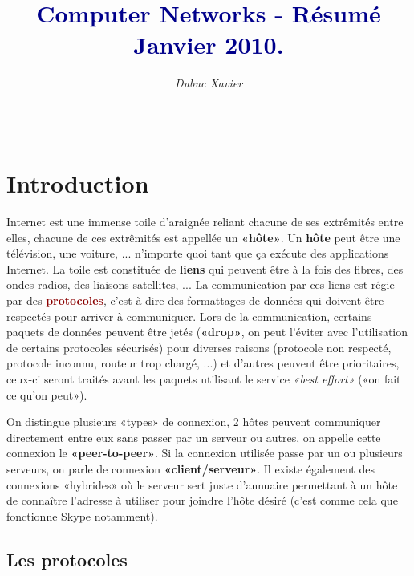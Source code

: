 \documentclass{article}
\title{\textbf{\textcolor{darkblue}{Computer Networks - Résumé Janvier 2010.}}}
\author{\textit{Dubuc Xavier}}
\newcommand{\dred}[1]{\textcolor{darkred}{\textbf{#1}}}
\begin{document}
\maketitle

\hbox{\raisebox{0.4em}{\vrule depth 0.4pt height 0.4pt width 10cm}}

\tableofcontents

$ $ \\
\hbox{\raisebox{0.4em}{\vrule depth 0.4pt height 0.4pt width 10cm}}

\newpage

\section{Introduction}

Internet est une immense toile d'araignée reliant chacune de ses extrêmités entre elles, chacune de ces 
extrêmités est appellée un \textbf{«hôte»}. Un \textbf{hôte} peut être une télévision, une voiture, ... n'importe
quoi tant que ça exécute des applications Internet. La toile est constituée de \textbf{liens} qui peuvent être à
la fois des fibres, des ondes radios, des liaisons satellites, ... La communication par ces liens est régie par 
des \dred{protocoles}, c'est-à-dire des formattages de données qui doivent être respectés pour arriver à 
communiquer. Lors de la communication, certains paquets de données peuvent être jetés (\textbf{«drop»}, on peut
l'éviter avec l'utilisation de certains protocoles sécurisés) pour diverses raisons (protocole non respecté, 
protocole inconnu, routeur trop chargé, ...) et d'autres peuvent être prioritaires, ceux-ci seront traités avant 
les paquets utilisant le service \textit{«best effort»} («on fait ce qu'on peut»).

On distingue plusieurs «types» de connexion, 2 hôtes peuvent communiquer directement entre eux sans passer par
un serveur ou autres, on appelle cette connexion le \textbf{«peer-to-peer»}. Si la connexion utilisée passe par 
un ou plusieurs serveurs, on parle de connexion \textbf{«client/serveur»}. Il existe également des connexions
«hybrides» où le serveur sert juste d'annuaire permettant à un hôte de connaître l'adresse à utiliser pour 
joindre l'hôte désiré (c'est comme cela que fonctionne Skype notamment).

\subsection{Les protocoles}
\end{document}
